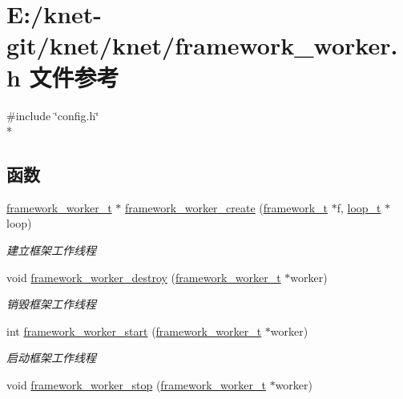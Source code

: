 \hypertarget{a00060}{}\section{E\+:/knet-\/git/knet/knet/framework\+\_\+worker.h 文件参考}
\label{a00060}
{\ttfamily \#include \char`\"{}config.\+h\char`\"{}}\\*
\subsection*{函数}
\begin{DoxyCompactItemize}
\item 
\hyperlink{a00050_aeb7a44e6b579659a8aae81f3ab819af3_aeb7a44e6b579659a8aae81f3ab819af3}{framework\+\_\+worker\+\_\+t} $\ast$ \hyperlink{a00060_a033314598ad1544a7b6cc0cf2e5930f2_a033314598ad1544a7b6cc0cf2e5930f2}{framework\+\_\+worker\+\_\+create} (\hyperlink{a00050_a6149d769f6f07ed14a40a271c95d8463_a6149d769f6f07ed14a40a271c95d8463}{framework\+\_\+t} $\ast$f, \hyperlink{a00050_a9c3ad1cd2de83e09f3a7b59fa82c94ee_a9c3ad1cd2de83e09f3a7b59fa82c94ee}{loop\+\_\+t} $\ast$loop)
\begin{DoxyCompactList}\small\item\em 建立框架工作线程 \end{DoxyCompactList}\item 
void \hyperlink{a00060_add5ddcbe427122e3afe63a10e3448116_add5ddcbe427122e3afe63a10e3448116}{framework\+\_\+worker\+\_\+destroy} (\hyperlink{a00050_aeb7a44e6b579659a8aae81f3ab819af3_aeb7a44e6b579659a8aae81f3ab819af3}{framework\+\_\+worker\+\_\+t} $\ast$worker)
\begin{DoxyCompactList}\small\item\em 销毁框架工作线程 \end{DoxyCompactList}\item 
int \hyperlink{a00060_a8791f9f6e107cd5127797cbffcd65ea8_a8791f9f6e107cd5127797cbffcd65ea8}{framework\+\_\+worker\+\_\+start} (\hyperlink{a00050_aeb7a44e6b579659a8aae81f3ab819af3_aeb7a44e6b579659a8aae81f3ab819af3}{framework\+\_\+worker\+\_\+t} $\ast$worker)
\begin{DoxyCompactList}\small\item\em 启动框架工作线程 \end{DoxyCompactList}\item 
void \hyperlink{a00060_a22e4e55cc90068dc691d1b4de736fd6e_a22e4e55cc90068dc691d1b4de736fd6e}{framework\+\_\+worker\+\_\+stop} (\hyperlink{a00050_aeb7a44e6b579659a8aae81f3ab819af3_aeb7a44e6b579659a8aae81f3ab819af3}{framework\+\_\+worker\+\_\+t} $\ast$worker)

\end{DoxyCompactItemize}
